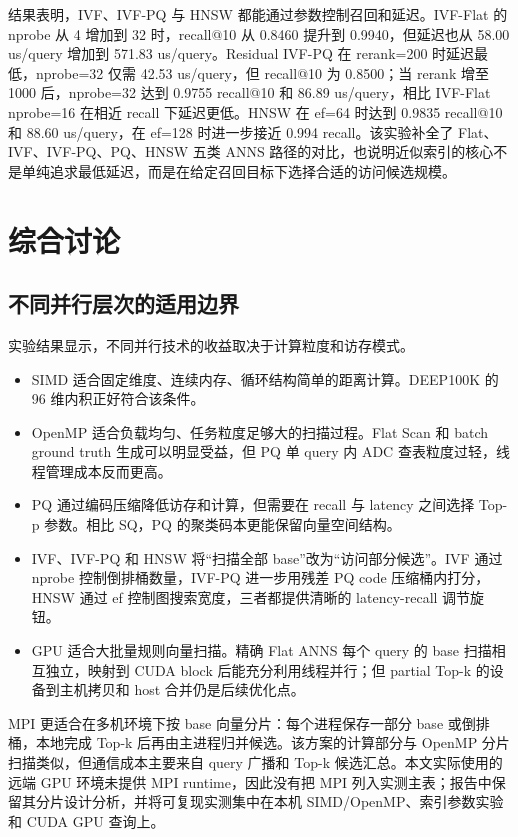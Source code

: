 \documentclass[UTF8,a4paper,10pt]{ctexart}
\begin{document}
结果表明，IVF、IVF-PQ 与 HNSW 都能通过参数控制召回和延迟。IVF-Flat 的 nprobe 从 4 增加到 32 时，recall@10 从 0.8460 提升到 0.9940，但延迟也从 58.00 us/query 增加到 571.83 us/query。Residual IVF-PQ 在 rerank=200 时延迟最低，nprobe=32 仅需 42.53 us/query，但 recall@10 为 0.8500；当 rerank 增至 1000 后，nprobe=32 达到 0.9755 recall@10 和 86.89 us/query，相比 IVF-Flat nprobe=16 在相近 recall 下延迟更低。HNSW 在 ef=64 时达到 0.9835 recall@10 和 88.60 us/query，在 ef=128 时进一步接近 0.994 recall。该实验补全了 Flat、IVF、IVF-PQ、PQ、HNSW 五类 ANNS 路径的对比，也说明近似索引的核心不是单纯追求最低延迟，而是在给定召回目标下选择合适的访问候选规模。

\section{综合讨论}

\subsection{不同并行层次的适用边界}

实验结果显示，不同并行技术的收益取决于计算粒度和访存模式。

\begin{itemize}
    \item SIMD 适合固定维度、连续内存、循环结构简单的距离计算。DEEP100K 的 96 维内积正好符合该条件。
    \item OpenMP 适合负载均匀、任务粒度足够大的扫描过程。Flat Scan 和 batch ground truth 生成可以明显受益，但 PQ 单 query 内 ADC 查表粒度过轻，线程管理成本反而更高。
    \item PQ 通过编码压缩降低访存和计算，但需要在 recall 与 latency 之间选择 Top-p 参数。相比 SQ，PQ 的聚类码本更能保留向量空间结构。
    \item IVF、IVF-PQ 和 HNSW 将“扫描全部 base”改为“访问部分候选”。IVF 通过 nprobe 控制倒排桶数量，IVF-PQ 进一步用残差 PQ code 压缩桶内打分，HNSW 通过 ef 控制图搜索宽度，三者都提供清晰的 latency-recall 调节旋钮。
    \item GPU 适合大批量规则向量扫描。精确 Flat ANNS 每个 query 的 base 扫描相互独立，映射到 CUDA block 后能充分利用线程并行；但 partial Top-k 的设备到主机拷贝和 host 合并仍是后续优化点。
\end{itemize}

MPI 更适合在多机环境下按 base 向量分片：每个进程保存一部分 base 或倒排桶，本地完成 Top-k 后再由主进程归并候选。该方案的计算部分与 OpenMP 分片扫描类似，但通信成本主要来自 query 广播和 Top-k 候选汇总。本文实际使用的远端 GPU 环境未提供 MPI runtime，因此没有把 MPI 列入实测主表；报告中保留其分片设计分析，并将可复现实测集中在本机 SIMD/OpenMP、索引参数实验和 CUDA GPU 查询上。
\end{document}
